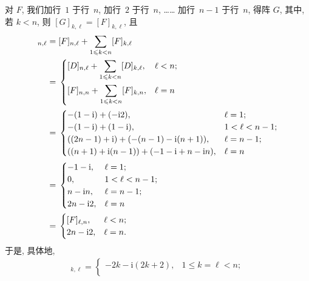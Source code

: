 \documentclass[../libro.tex]{subfiles}
\begin{document}
\begin{example}
    对 \(F\),
    我们加行~\(1\) 于行~\(n\),
    加行~\(2\) 于行~\(n\),
    ……
    加行~\(n-1\) 于行~\(n\),
    得阵 \(G\),
    其中, 若 \(k < n\), 则 \([G]_{k,\ell} = [F]_{k,\ell}\),
    且
    \begin{align*}
        [G]_{n,\ell}
        = {} &
        [F]_{n,\ell} + \sum_{1 \leq k < n} [F]_{k,\ell}
        \\
        = {} &
        \begin{dcases}
            [D]_{n,\ell} + \sum_{1 \leq k < n} [D]_{k,\ell}, & \ell < n; \\
            [F]_{n,n} + \sum_{1 \leq k < n} [F]_{k,n},       & \ell = n
        \end{dcases}
        \\
        = {} &
        \begin{cases}
            -(1 - \mathrm{i}) + (-\mathrm{i} 2),                               & \ell = 1;         \\
            -(1 - \mathrm{i}) + (1 - \mathrm{i}),                              & 1 < \ell < n - 1; \\
            ((2n-1) + \mathrm{i}) + (-(n-1) - \mathrm{i} (n+1)),               & \ell = n - 1;     \\
            ((n+1) + \mathrm{i} (n-1)) + (-1 - \mathrm{i} + n - \mathrm{i} n), & \ell = n
        \end{cases}
        \\
        = {} &
        \begin{cases}
            -1 - \mathrm{i},   & \ell = 1;         \\
            0,                 & 1 < \ell < n - 1; \\
            n - \mathrm{i} n,  & \ell = n - 1;     \\
            2n - \mathrm{i} 2, & \ell = n
        \end{cases}
        \\
        = {} &
        \begin{cases}
            [F]_{\ell,n},      & \ell < n; \\
            2n - \mathrm{i} 2, & \ell = n.
        \end{cases}
    \end{align*}
    于是, 具体地,
    \begin{align*}
        [G]_{k,\ell} =
        \begin{cases}
            -2k - \mathrm{i} (2k+2), & 1 \leq k = \ell < n;                            \\

\end{cases}
\end{align*}
\end{example}
\end{document}
